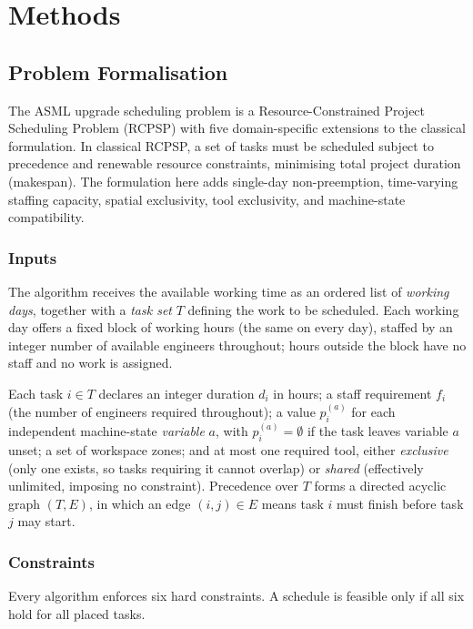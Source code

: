 \documentclass[conference]{IEEEtran}
\begin{document}
\section{Methods}
\label{sec:methods}

\subsection{Problem Formalisation}

The ASML upgrade scheduling problem is a Resource-Constrained Project
Scheduling Problem (RCPSP) with five domain-specific extensions to
the classical formulation. In classical RCPSP, a set of tasks must
be scheduled subject to precedence and renewable resource
constraints, minimising total project duration (makespan). The
formulation here adds single-day non-preemption, time-varying
staffing capacity, spatial exclusivity, tool exclusivity, and
machine-state compatibility.

\subsubsection{Inputs}

The algorithm receives the available working time as an ordered list
of \emph{working days}, together with a \emph{task set} $T$ defining
the work to be scheduled. Each working day offers a fixed block of
working hours (the same on every day), staffed by an integer number of
available engineers throughout; hours outside the block have no staff
and no work is assigned.

Each task $i \in T$ declares an integer duration $d_i$ in hours; a
staff requirement $f_i$ (the number of engineers required throughout);
a value $p_i^{(a)}$ for each independent machine-state
\emph{variable} $a$, with $p_i^{(a)} = \emptyset$ if the task leaves
variable $a$ unset; a set of workspace zones; and at most one required
tool, either \emph{exclusive} (only one exists, so tasks requiring it
cannot overlap) or \emph{shared} (effectively unlimited, imposing no
constraint). Precedence over $T$ forms a directed acyclic
graph $(T, E)$, in which an edge $(i, j) \in E$ means task $i$ must
finish before task $j$ may start.

\subsubsection{Constraints}

Every algorithm enforces six hard constraints. A schedule is feasible
only if all six hold for all placed tasks.
\end{document}
